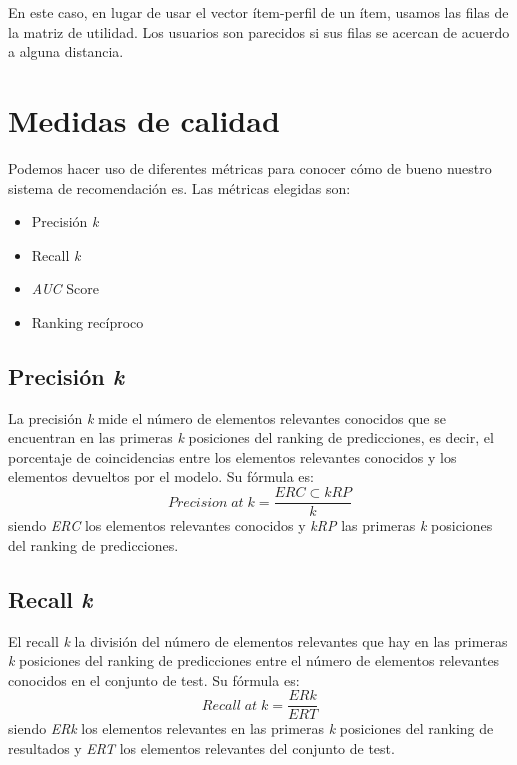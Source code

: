 En este caso, en lugar de usar el vector ítem-perfil de un ítem, usamos las filas de la matriz de utilidad. Los usuarios son parecidos si sus filas se acercan de acuerdo a alguna distancia.

\section{Medidas de calidad}\label{medidas-de-calidad}
Podemos hacer uso de diferentes métricas para conocer cómo de bueno nuestro sistema de recomendación es. Las métricas elegidas son:
\begin{itemize}
\tightlist
\item Precisión \textit{k}
\item Recall \textit{k}
\item \textit{AUC} Score
\item Ranking recíproco
\end{itemize}

\subsection{Precisión \textit{k}}\label{precision-k}
La precisión \textit{k} \cite{precision_at_k} mide el número de elementos relevantes conocidos que se encuentran en las primeras \textit{k} posiciones del ranking de predicciones, es decir, el porcentaje de coincidencias entre los elementos relevantes conocidos y los elementos devueltos por el modelo. Su fórmula es:
\begin{equation}
Precision\;at\;k = \frac{ERC \subset kRP}{k}
\end{equation}
siendo \textit{ERC} los elementos relevantes conocidos y \textit{kRP} las primeras \textit{k} posiciones del ranking de predicciones.

\subsection{Recall \textit{k}}\label{recall-k}
El recall \textit{k} \cite{recall_at_k} la división del número de elementos relevantes que hay en las primeras \textit{k} posiciones del ranking de predicciones entre el número de elementos relevantes conocidos en el conjunto de test. Su fórmula es:
\begin{equation}
Recall\;at\;k = \frac{ERk}{ERT}
\end{equation}
siendo \textit{ERk} los elementos relevantes en las primeras \textit{k} posiciones del ranking de resultados y \textit{ERT} los elementos relevantes del conjunto de test.

